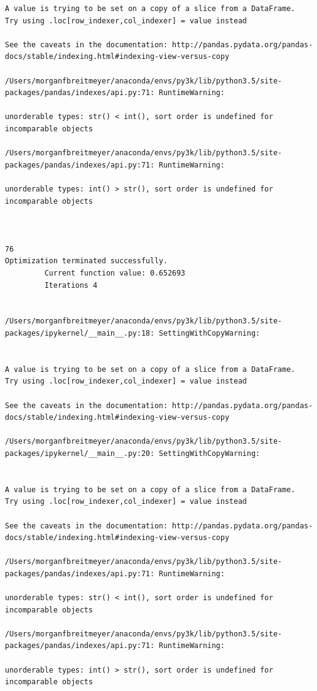 \begin{lstlisting}
A value is trying to be set on a copy of a slice from a DataFrame.
Try using .loc[row_indexer,col_indexer] = value instead

See the caveats in the documentation: http://pandas.pydata.org/pandas-docs/stable/indexing.html#indexing-view-versus-copy

/Users/morganfbreitmeyer/anaconda/envs/py3k/lib/python3.5/site-packages/pandas/indexes/api.py:71: RuntimeWarning:

unorderable types: str() < int(), sort order is undefined for incomparable objects

/Users/morganfbreitmeyer/anaconda/envs/py3k/lib/python3.5/site-packages/pandas/indexes/api.py:71: RuntimeWarning:

unorderable types: int() > str(), sort order is undefined for incomparable objects



76
Optimization terminated successfully.
         Current function value: 0.652693
         Iterations 4


/Users/morganfbreitmeyer/anaconda/envs/py3k/lib/python3.5/site-packages/ipykernel/__main__.py:18: SettingWithCopyWarning:


A value is trying to be set on a copy of a slice from a DataFrame.
Try using .loc[row_indexer,col_indexer] = value instead

See the caveats in the documentation: http://pandas.pydata.org/pandas-docs/stable/indexing.html#indexing-view-versus-copy

/Users/morganfbreitmeyer/anaconda/envs/py3k/lib/python3.5/site-packages/ipykernel/__main__.py:20: SettingWithCopyWarning:


A value is trying to be set on a copy of a slice from a DataFrame.
Try using .loc[row_indexer,col_indexer] = value instead

See the caveats in the documentation: http://pandas.pydata.org/pandas-docs/stable/indexing.html#indexing-view-versus-copy

/Users/morganfbreitmeyer/anaconda/envs/py3k/lib/python3.5/site-packages/pandas/indexes/api.py:71: RuntimeWarning:

unorderable types: str() < int(), sort order is undefined for incomparable objects

/Users/morganfbreitmeyer/anaconda/envs/py3k/lib/python3.5/site-packages/pandas/indexes/api.py:71: RuntimeWarning:

unorderable types: int() > str(), sort order is undefined for incomparable objects




\end{lstlisting}
